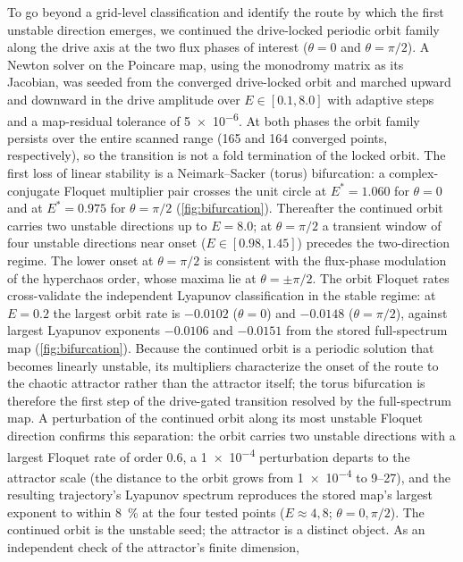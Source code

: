 \documentclass[aip,cha,reprint]{revtex4-2}
\begin{document}
To go beyond a grid-level classification and identify the route by which the
first unstable direction emerges, we continued the drive-locked periodic orbit
family along the drive axis at the two flux phases of interest ($\theta=0$ and
$\theta=\pi/2$). A Newton solver on the Poincare map, using the monodromy
matrix as its Jacobian, was seeded from the converged drive-locked orbit and
marched upward and downward in the drive amplitude over
$E\in[\num{0.1},\num{8.0}]$ with adaptive steps and a map-residual tolerance of
\num{5e-6}. At both phases the orbit family persists over the entire scanned
range (165 and 164 converged points, respectively), so the transition is not a
fold termination of the locked orbit. The first loss of linear stability is a
Neimark--Sacker (torus) bifurcation: a complex-conjugate Floquet multiplier
pair crosses the unit circle at $E^{*}=\num{1.060}$ for $\theta=0$ and at
$E^{*}=\num{0.975}$ for $\theta=\pi/2$ (\cref{fig:bifurcation}). Thereafter the
continued orbit carries two unstable directions up to $E=\num{8.0}$; at
$\theta=\pi/2$ a transient window of four unstable directions near onset
($E\in[\num{0.98},\num{1.45}]$) precedes the two-direction regime. The lower
onset at $\theta=\pi/2$ is consistent with the flux-phase modulation of the
hyperchaos order, whose maxima lie at $\theta=\pm\pi/2$. The orbit Floquet
rates cross-validate the independent Lyapunov classification in the stable
regime: at $E=\num{0.2}$ the largest orbit rate is $-\num{0.0102}$
($\theta=0$) and $-\num{0.0148}$ ($\theta=\pi/2$), against largest Lyapunov
exponents $-\num{0.0106}$ and $-\num{0.0151}$ from the stored full-spectrum
map (\cref{fig:bifurcation}). Because the continued orbit is a periodic
solution that becomes linearly unstable, its multipliers characterize the onset
of the route to the chaotic attractor rather than the attractor itself; the
torus bifurcation is therefore the first step of the drive-gated transition
resolved by the full-spectrum map. A perturbation of the continued orbit along
its most unstable Floquet direction confirms this separation: the orbit carries
two unstable directions with a largest Floquet rate of order \num{0.6}, a
\num{1e-4} perturbation departs to the attractor scale (the distance to the
orbit grows from \num{1e-4} to \num{9}--\num{27}), and the resulting
trajectory's Lyapunov spectrum reproduces the stored map's largest exponent to
within \SI{8}{\percent} at the four tested points ($E\approx\num{4},\num{8}$;
$\theta=0,\pi/2$). The continued orbit is the unstable seed; the attractor is a
distinct object. As an independent check of the attractor's finite dimension,
\end{document}
